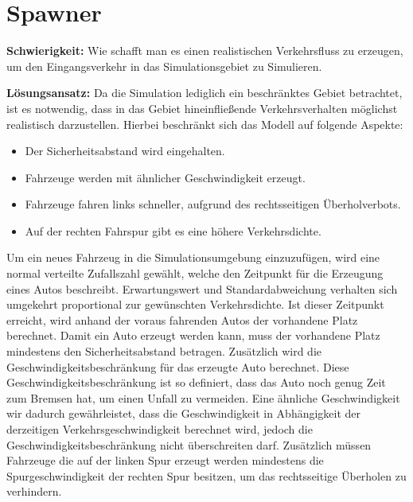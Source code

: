 \section{Spawner}
\textbf{Schwierigkeit:} Wie schafft man es einen realistischen Verkehrsfluss zu erzeugen, um den Eingangsverkehr in das Simulationsgebiet zu Simulieren.
\begin{addmargin}[25pt]{0pt}
	\item \textbf{Lösungsansatz:} Da die Simulation lediglich ein beschränktes Gebiet betrachtet, ist es notwendig, dass in das Gebiet hineinfließende Verkehrsverhalten möglichst realistisch darzustellen. Hierbei beschr\"ankt sich das Modell auf folgende Aspekte: 
\begin{itemize}
	\item Der Sicherheitsabstand wird eingehalten.
	\item Fahrzeuge werden mit ähnlicher Geschwindigkeit erzeugt.
	\item Fahrzeuge fahren links schneller, aufgrund des rechtsseitigen Überholverbots.
	\item Auf der rechten Fahrspur gibt es eine höhere Verkehrsdichte.
\end{itemize}
Um ein neues Fahrzeug in die Simulationsumgebung einzuzufügen, wird eine normal verteilte Zufallszahl gewählt, welche den Zeitpunkt für die Erzeugung eines Autos beschreibt. Erwartungswert und Standardabweichung verhalten sich umgekehrt proportional zur gewünschten Verkehrsdichte. Ist dieser Zeitpunkt erreicht, wird anhand der voraus fahrenden Autos der vorhandene Platz berechnet. Damit ein Auto erzeugt werden kann, muss der vorhandene Platz mindestens den Sicherheitsabstand betragen. Zusätzlich wird die Geschwindigkeitsbeschränkung für das erzeugte Auto berechnet. Diese Geschwindigkeitsbeschränkung ist so definiert, dass das Auto noch genug Zeit zum Bremsen hat, um einen Unfall zu vermeiden. Eine ähnliche Geschwindigkeit wir dadurch gewährleistet, dass die Geschwindigkeit in Abhängigkeit der derzeitigen Verkehrsgeschwindigkeit berechnet wird, jedoch die Geschwindigkeitsbeschränkung nicht überschreiten darf. Zusätzlich müssen Fahrzeuge die auf der linken Spur erzeugt werden mindestens die Spurgeschwindigkeit der rechten Spur besitzen, um das rechtsseitige Überholen zu verhindern.
\end{addmargin}

